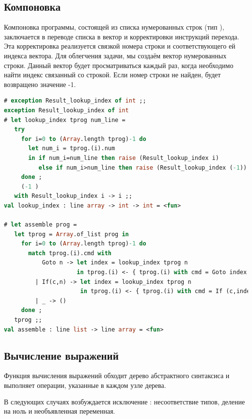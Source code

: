 \subsection{Компоновка}
\label{subsubsec:assembly}

Компоновка программы, состоящей из списка нумерованных строк (тип 
), заключается в переводе списка в вектор и корректировки 
инструкций перехода. Эта корректировка реализуется связкой номера строки и 
соответствующего ей индекса вектора. Для облегчения задачи, мы создаём вектор 
нумерованных строки. Данный вектор будет просматриваться каждый раз, когда 
необходимо найти индекс связанный со строкой. Если номер строки не найден, будет 
возвращено значение -1.

\begin{lstlisting}[language=OCaml]
# exception Result_lookup_index of int ;;
exception Result_lookup_index of int
# let lookup_index tprog num_line =
   try 
     for i=0 to (Array.length tprog)-1 do 
       let num_i = tprog.(i).num
       in if num_i=num_line then raise (Result_lookup_index i)
          else if num_i>num_line then raise (Result_lookup_index (-1))
     done ;
     (-1 )
   with Result_lookup_index i -> i ;;
val lookup_index : line array -> int -> int = <fun>

# let assemble prog =
   let tprog = Array.of_list prog in
     for i=0 to (Array.length tprog)-1 do
       match tprog.(i).cmd with
           Goto n -> let index = lookup_index tprog n
                     in tprog.(i) <- { tprog.(i) with cmd = Goto index }
         | If(c,n) -> let index = lookup_index tprog n
                      in tprog.(i) <- { tprog.(i) with cmd = If (c,index) }
         | _ -> ()
     done ;
   tprog ;;
val assemble : line list -> line array = <fun>
\end{lstlisting}

\subsection{Вычисление выражений}
\label{subsubsec:expression_evaluation}

Функция вычисления выражений обходит дерево абстрактного синтаксиса и выполняет 
операции, указанные в каждом узле дерева.

В следующих случаях возбуждается исключение : несоответствие 
типов, деление на ноль и необъявленная переменная.

